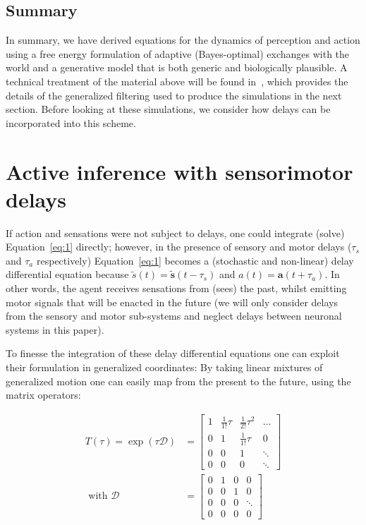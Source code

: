 \documentclass[a4paper]{article} %
\begin{document}
\subsection{Summary}

In summary, we have derived equations for the dynamics of perception and
action using a free energy formulation of adaptive (Bayes-optimal)
exchanges with the world and a generative model that is both generic and
biologically plausible. A technical treatment of the material above will
be found in~\citep{Friston10d}, which provides the details of the
generalized filtering used to produce the simulations in the next
section. Before looking at these simulations, we consider how delays can
be incorporated into this scheme.

\section{Active inference with sensorimotor delays}
\label{sec:delay}
If action and sensations were not subject to delays, one could integrate
(solve) Equation~\ref{eq:1} directly; however, in the presence of sensory and
motor delays ($\tau_s$ and $\tau_a$ respectively) Equation~\ref{eq:1} becomes a (stochastic and non-linear) delay differential equation because
$\tilde{s}(t) = \bm{\tilde{s}}(t - \tau_s)$ and $a(t) = \bm{a}(t + \tau_a)$. In other words, the agent receives sensations from (sees) the past,
whilst emitting motor signals that will be enacted in the future (we
will only consider delays from the sensory and motor sub-systems and
neglect delays between neuronal systems in this paper).

To finesse the integration of these delay differential equations one can
exploit their formulation in generalized coordinates: By taking linear
mixtures of generalized motion one can easily map from the present to
the future, using the matrix operators:

\begin{align}%
 T(\tau) = \exp(\tau \mathcal{D})  &=  \left[\begin{array}{cccc}1 & \frac{1}{1!}\tau & \frac{1}{2!}\tau^2 & \ldots \\0 & 1 & \frac{1}{1!}\tau & 0 \\0 & 0 & 1 & \ddots \\0 & 0 & 0 & \ddots\end{array}\right]  \label{eq:5} \\%
 \text{ with }  \mathcal{D} &= \left[\begin{array}{cccc}0 & 1 & 0 & 0 \\0 & 0 & 1 & 0 \\0 & 0 & 0 & \ddots \\0 & 0 & 0 & 0\end{array}\right] \nonumber%
\end{align}%
\end{document}
